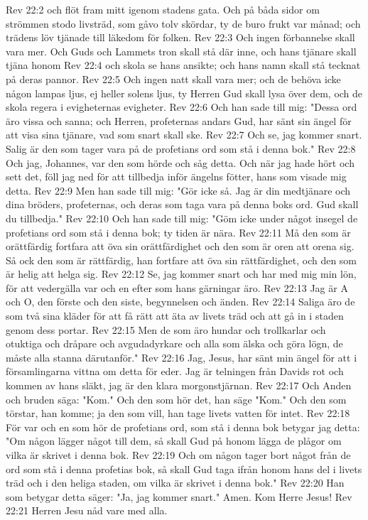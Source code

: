 Rev 22:2  och flöt fram mitt igenom stadens gata. Och på båda sidor om strömmen stodo livsträd, som gåvo tolv skördar, ty de buro frukt var månad; och trädens löv tjänade till läkedom för folken.
Rev 22:3  Och ingen förbannelse skall vara mer. Och Guds och Lammets tron skall stå där inne, och hans tjänare skall tjäna honom
Rev 22:4  och skola se hans ansikte; och hans namn skall stå tecknat på deras pannor.
Rev 22:5  Och ingen natt skall vara mer; och de behöva icke någon lampas ljus, ej heller solens ljus, ty Herren Gud skall lysa över dem, och de skola regera i evigheternas evigheter.
Rev 22:6  Och han sade till mig: "Dessa ord äro vissa och sanna; och Herren, profeternas andars Gud, har sänt sin ängel för att visa sina tjänare, vad som snart skall ske.
Rev 22:7  Och se, jag kommer snart. Salig är den som tager vara på de profetians ord som stå i denna bok."
Rev 22:8  Och jag, Johannes, var den som hörde och såg detta. Och när jag hade hört och sett det, föll jag ned för att tillbedja inför ängelns fötter, hans som visade mig detta.
Rev 22:9  Men han sade till mig: "Gör icke så. Jag är din medtjänare och dina bröders, profeternas, och deras som taga vara på denna boks ord. Gud skall du tillbedja."
Rev 22:10  Och han sade till mig: "Göm icke under något insegel de profetians ord som stå i denna bok; ty tiden är nära.
Rev 22:11  Må den som är orättfärdig fortfara att öva sin orättfärdighet och den som är oren att orena sig. Så ock den som är rättfärdig, han fortfare att öva sin rättfärdighet, och den som är helig att helga sig.
Rev 22:12  Se, jag kommer snart och har med mig min lön, för att vedergälla var och en efter som hans gärningar äro.
Rev 22:13  Jag är A och O, den förste och den siste, begynnelsen och änden.
Rev 22:14  Saliga äro de som två sina kläder för att få rätt att äta av livets träd och att gå in i staden genom dess portar.
Rev 22:15  Men de som äro hundar och trollkarlar och otuktiga och dråpare och avgudadyrkare och alla som älska och göra lögn, de måste alla stanna därutanför."
Rev 22:16  Jag, Jesus, har sänt min ängel för att i församlingarna vittna om detta för eder. Jag är telningen från Davids rot och kommen av hans släkt, jag är den klara morgonstjärnan.
Rev 22:17  Och Anden och bruden säga: "Kom." Och den som hör det, han säge "Kom." Och den som törstar, han komme; ja den som vill, han tage livets vatten för intet.
Rev 22:18  För var och en som hör de profetians ord, som stå i denna bok betygar jag detta: "Om någon lägger något till dem, så skall Gud på honom lägga de plågor om vilka är skrivet i denna bok.
Rev 22:19  Och om någon tager bort något från de ord som stå i denna profetias bok, så skall Gud taga ifrån honom hans del i livets träd och i den heliga staden, om vilka är skrivet i denna bok."
Rev 22:20  Han som betygar detta säger: "Ja, jag kommer snart." Amen. Kom Herre Jesus!
Rev 22:21  Herren Jesu nåd vare med alla.


